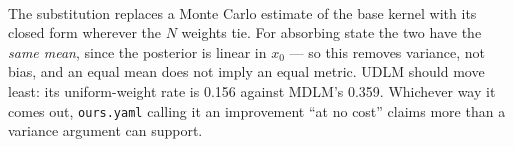 \documentclass[11pt]{article}
\begin{document}
\begin{table}[htbp]
\centering
\footnotesize
\setlength{\tabcolsep}{4pt}
\\[0.4em] \begin{minipage}{0.92\textwidth}\footnotesize The substitution replaces a Monte Carlo estimate of the base kernel with its closed form wherever the $N$ weights tie. For absorbing state the two have the \emph{same mean}, since the posterior is linear in $x_0$ --- so this removes variance, not bias, and an equal mean does not imply an equal metric. UDLM should move least: its uniform-weight rate is 0.156 against MDLM's 0.359. Whichever way it comes out, \texttt{ours.yaml} calling it an improvement ``at no cost'' claims more than a variance argument can support.\end{minipage}
\caption{$\mathrm{A}_{\mathrm{eu}} - \mathrm{A}$: what the exact-uniform step does on its own, paired at matched $(N, \text{mode})$ at $\lambda = 5000$. The only difference between the two is the flag.}
\label{tab:ov-exactunif}
\end{table}
\end{document}
